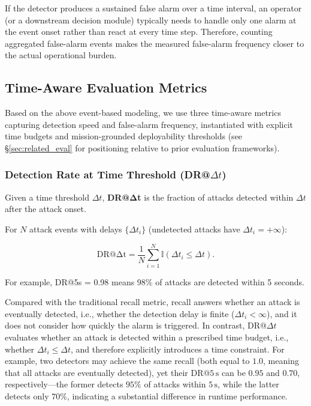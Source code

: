 \documentclass{ieeeaccess}
\begin{document}
If the detector produces a sustained false alarm over a time interval, an operator (or a downstream decision module) typically needs to handle only one alarm at the event onset rather than react at every time step. Therefore, counting aggregated false-alarm events makes the measured false-alarm frequency closer to the actual operational burden.

\subsection{Time-Aware Evaluation Metrics}

Based on the above event-based modeling, we use three time-aware metrics capturing detection speed and false-alarm frequency, instantiated with explicit time budgets and mission-grounded deployability thresholds (see \S\ref{sec:related_eval} for positioning relative to prior evaluation frameworks).

\subsubsection{Detection Rate at Time Threshold (DR@$\Delta t$)}

Given a time threshold \(\Delta t\), \textbf{DR@Δt} is the fraction of attacks detected within \(\Delta t\) after the attack onset.

For \(N\) attack events with delays \(\{\Delta t_i\}\) (undetected attacks have \(\Delta t_i=+\infty\)):

\begin{equation}
\mathrm{DR@\Delta t} = \frac{1}{N}\sum_{i=1}^N \mathbb{I}(\Delta t_i \le \Delta t).
\end{equation}

For example, DR@5s = 0.98 means 98\% of attacks are detected within 5 seconds.

Compared with the traditional recall metric, recall answers whether an attack is eventually detected, i.e., whether the detection delay is finite ($\Delta t_i < \infty$), and it does not consider how quickly the alarm is triggered. In contrast, DR@$\Delta t$ evaluates whether an attack is detected within a prescribed time budget, i.e., whether $\Delta t_i \le \Delta t$, and therefore explicitly introduces a time constraint. For example, two detectors may achieve the same recall (both equal to $1.0$, meaning that all attacks are eventually detected), yet their DR@$5\,\mathrm{s}$ can be $0.95$ and $0.70$, respectively---the former detects $95\%$ of attacks within $5\,\mathrm{s}$, while the latter detects only $70\%$, indicating a substantial difference in runtime performance.
\end{document}
